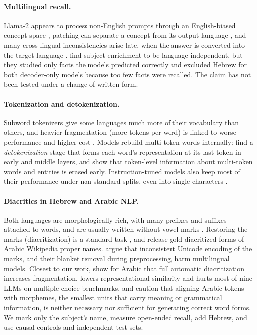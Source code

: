 \documentclass[11pt]{article}
\begin{document}
\paragraph{Multilingual recall.}
Llama-2 appears to process non-English prompts through an English-biased concept
space \citep{wendler-etal-2024-llamas}, patching can separate a concept from its
output language \citep{dumas-etal-2025-separating}, and many cross-lingual
inconsistencies arise late, when the answer is converted into the target
language \citep{wang-etal-2025-lost-multilinguality}.
\citet{fierro-etal-2025-multilingual} find subject enrichment to be
language-independent, but they studied only facts the models predicted correctly
and excluded Hebrew for both decoder-only models because too few facts were
recalled. The claim has not been tested under a change of written form.

\paragraph{Tokenization and detokenization.}
Subword tokenizers \citep{sennrich-etal-2016-neural} give some languages much
more of their vocabulary than others, and heavier fragmentation (more tokens per
word) is linked to worse performance and higher cost
\citep{rust-etal-2021-good,ahia-etal-2023-languages,petrov-etal-2023-unfairness}.
Models rebuild multi-token words internally: \citet{kaplan-etal-2025-tokens} find
a \emph{detokenization} stage that forms each word's representation at its last
token in early and middle layers, and \citet{feucht-etal-2024-token} show that
token-level information about multi-token words and entities is erased early.
Instruction-tuned models also keep most of their performance under non-standard splits, even into single characters
\citep{zheng-etal-2025-broken}.

\paragraph{Diacritics in Hebrew and Arabic NLP.}
Both languages are morphologically rich, with many prefixes and suffixes attached
to words, and are usually written without vowel marks
\citep{habash-2010-introduction,tsarfaty-etal-2020-spmrl,seker-etal-2022-alephbert}.
Restoring the marks (diacritization) is a standard task
\citep{gershuni-pinter-2022-restoring}, and \citet{bondok-etal-2025-proper}
release gold diacritized forms of Arabic Wikipedia proper names.
\citet{gorman-pinter-2025-dont} argue that inconsistent Unicode encoding of the
marks, and their blanket removal during preprocessing, harm multilingual models.
Closest to our work, \citet{inoue-etal-2026-diacritics} show for Arabic that
full automatic diacritization increases fragmentation, lowers representational
similarity and hurts most of nine LLMs on multiple-choice benchmarks, and
\citet{alakeel-etal-2026-morphemes} caution that aligning Arabic tokens with
morphemes, the smallest units that carry meaning or grammatical information, is
neither necessary nor sufficient for generating correct word forms.
We mark only the subject's name, measure open-ended recall, add Hebrew, and use
causal controls and independent test sets.
\end{document}
